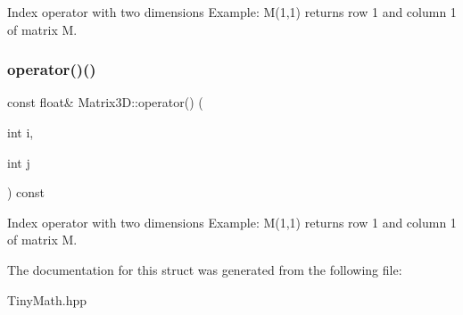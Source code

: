 Index operator with two dimensions Example\+: M(1,1) returns row 1 and column 1 of matrix M. \mbox{\label{structMatrix3D_ad571200a0fa09b5b2cea2f86babd462d}} 
\subsubsection{\texorpdfstring{operator()()}{operator()()}\hspace{0.1cm}{\footnotesize\ttfamily [2/2]}}
{\footnotesize\ttfamily const float\& Matrix3\+D\+::operator() (\begin{DoxyParamCaption}\item[{int}]{i,  }\item[{int}]{j }\end{DoxyParamCaption}) const\hspace{0.3cm}{\ttfamily [inline]}}

Index operator with two dimensions Example\+: M(1,1) returns row 1 and column 1 of matrix M. 

The documentation for this struct was generated from the following file\+:\begin{DoxyCompactItemize}
\item 
Tiny\+Math.\+hpp\end{DoxyCompactItemize}
